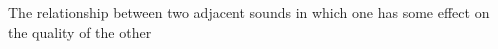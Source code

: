 The relationship between two adjacent sounds in which one has some effect on the quality of the other
